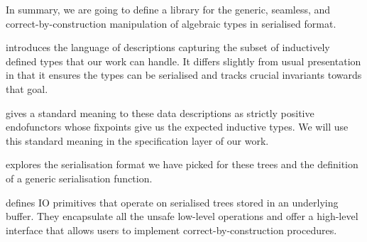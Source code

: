 In summary, we are going to define a library for the
generic,
seamless,
and correct-by-construction
manipulation of algebraic types in serialised format.


 introduces the language of descriptions capturing the
subset of inductively defined types that our work can handle.
It differs slightly from usual presentation in that it ensures the
types can be serialised and tracks crucial invariants towards that goal.

 gives a standard meaning to these data descriptions
as strictly positive endofunctors whose fixpoints give us the expected
inductive types.
%
We will use this standard meaning in the specification layer of our work.

 explores the serialisation format we have picked
for these trees and the definition of a generic serialisation function.

 defines IO primitives that operate on serialised
trees stored in an underlying buffer.
%
They encapsulate all the unsafe low-level operations and offer a
high-level interface that allows users to implement correct-by-construction
procedures.


